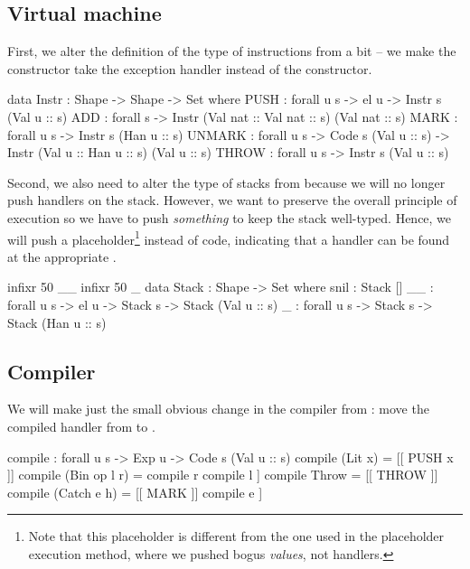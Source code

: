 \subsection{Virtual machine}

First, we alter the definition of the type of instructions from
 a bit -- we make the  constructor take
the exception handler instead of the  constructor.

\begin{code}
  data Instr : Shape -> Shape -> Set where
    PUSH : forall {u s} -> el u -> Instr s (Val u :: s)
    ADD : forall {s} -> Instr (Val nat :: Val nat :: s) (Val nat :: s)
    MARK : forall {u s} -> Instr s (Han u :: s)
    UNMARK : forall {u s} -> Code s (Val u :: s) -> Instr (Val u :: Han u :: s) (Val u :: s)
    THROW : forall {u s} -> Instr s (Val u :: s)
\end{code}

Second, we also need to alter the type of stacks from 
because we will no longer push handlers on the stack. However, we want to
preserve the overall principle of execution so we have to push \emph{something}
to keep the stack well-typed.  Hence, we will push a placeholder\footnote{ Note
that this placeholder is different from the one used in the placeholder
execution method, where we pushed bogus \emph{values}, not handlers.} instead
of code, indicating that a handler can be found at the appropriate
.

\begin{code}
  infixr 50 _\scons\_
  infixr 50 \void\sconsh\_
  data Stack : Shape -> Set where
    snil : Stack []
    _\scons\_ : forall {u s} -> el u -> Stack s -> Stack (Val u :: s)
    \void\sconsh\_ : forall {u s} -> Stack s -> Stack (Han u :: s)
\end{code}

\subsection{Compiler}

We will make just the small obvious change in the compiler from
: move the compiled handler from  to .

\label{sec:hau-compile}\begin{code}
compile : forall {u s} -> Exp u -> Code s (Val u :: s)
compile (Lit x) = [[ PUSH x ]]
compile (Bin op l r) = compile r \app compile l \app [[ opInstr op ]] 
compile Throw = [[ THROW ]]
compile (Catch e h) = [[ MARK ]] \app compile e \app [[ UNMARK (compile h) ]]
\end{code}

